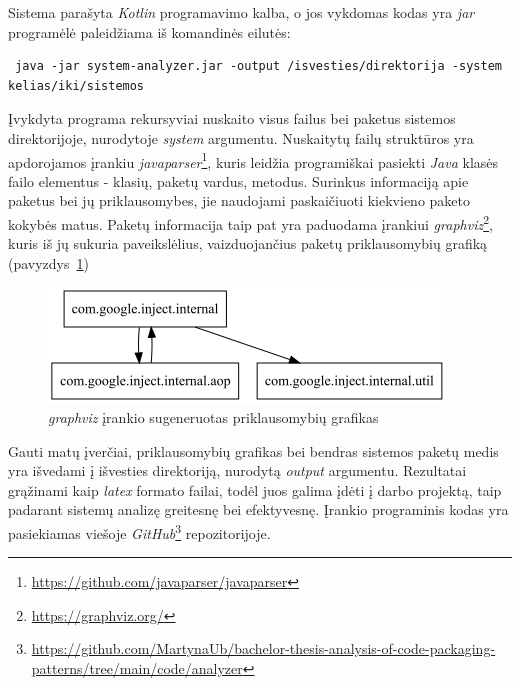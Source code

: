 Sistema parašyta \textit{Kotlin} programavimo kalba, o jos vykdomas kodas yra \textit{jar} programėlė paleidžiama iš komandinės eilutės:
\begin{lstlisting}
 java -jar system-analyzer.jar -output /isvesties/direktorija -system  kelias/iki/sistemos
\end{lstlisting}
Įvykdyta programa rekursyviai nuskaito visus failus bei paketus sistemos direktorijoje, nurodytoje \textit{system} argumentu.
Nuskaitytų failų struktūros yra apdorojamos įrankiu \textit{javaparser}\footnote{\url{https://github.com/javaparser/javaparser}}, kuris leidžia
programiškai pasiekti \textit{Java} klasės failo elementus - klasių, paketų vardus, metodus.
Surinkus informaciją apie paketus bei jų priklausomybes, jie naudojami paskaičiuoti kiekvieno paketo kokybės matus.
Paketų informacija taip pat yra paduodama įrankiui \textit{graphviz}\footnote{\url{https://graphviz.org/}}, kuris iš jų sukuria paveikslėlius, vaizduojančius paketų
priklausomybių grafiką (pavyzdys~\ref{img:graphviz})
\begin{figure}[H]
    \centering
    \includegraphics[scale=0.6]{img/packages_example}
    \caption{\textit{graphviz} įrankio sugeneruotas priklausomybių grafikas}
    \label{img:graphviz}
\end{figure}
Gauti matų įverčiai, priklausomybių grafikas bei bendras sistemos paketų medis yra išvedami į išvesties direktoriją, nurodytą \textit{output} argumentu.
Rezultatai grąžinami kaip \textit{latex} formato failai, todėl juos galima įdėti į darbo projektą,
taip padarant sistemų analizę greitesnę bei efektyvesnę.
Įrankio programinis kodas yra pasiekiamas viešoje \textit{GitHub}\footnote{\url{https://github.com/MartynaUb/bachelor-thesis-analysis-of-code-packaging-patterns/tree/main/code/analyzer}} repozitorijoje.

